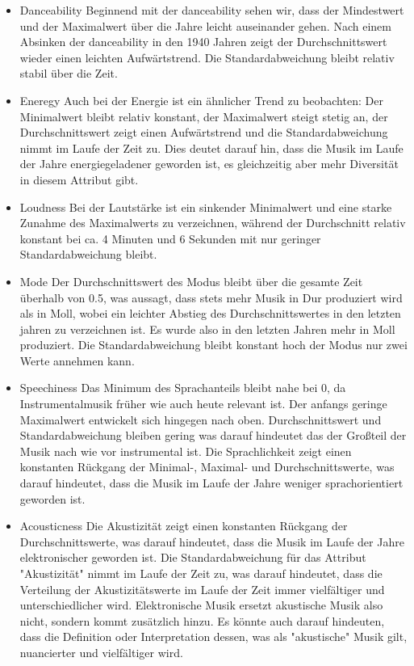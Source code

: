 \documentclass[conference]{IEEEtran}
\begin{document}
\begin{itemize}
\item{Danceability} Beginnend mit der danceability sehen wir, dass der Mindestwert und der Maximalwert über die Jahre leicht auseinander gehen. Nach einem Absinken der danceability in den 1940 Jahren zeigt der Durchschnittswert wieder einen leichten Aufwärtstrend. Die Standardabweichung bleibt relativ stabil über die Zeit.

\item{Eneregy} Auch bei der Energie ist ein ähnlicher Trend zu beobachten: Der Minimalwert bleibt relativ konstant, der Maximalwert steigt stetig an, der Durchschnittswert zeigt einen Aufwärtstrend und die Standardabweichung nimmt im Laufe der Zeit zu. Dies deutet darauf hin, dass die Musik im Laufe der Jahre energiegeladener geworden ist, es gleichzeitig aber mehr Diversität in diesem Attribut gibt.

\item{Loudness} Bei der Lautstärke ist ein sinkender Minimalwert und eine starke Zunahme des Maximalwerts zu verzeichnen, während der Durchschnitt relativ konstant bei ca. 4 Minuten und 6 Sekunden mit nur geringer Standardabweichung bleibt.

\item{Mode} Der Durchschnittswert des Modus bleibt über die gesamte Zeit überhalb von 0.5, was aussagt, dass stets mehr Musik in Dur produziert wird als in Moll, wobei ein leichter Abstieg des Durchschnittswertes in den letzten jahren zu verzeichnen ist. Es wurde also in den letzten Jahren mehr in Moll produziert. Die Standardabweichung bleibt konstant hoch der Modus nur zwei Werte annehmen kann.

\item{Speechiness} Das Minimum des Sprachanteils bleibt nahe bei 0, da Instrumentalmusik früher wie auch heute relevant ist. Der anfangs geringe Maximalwert entwickelt sich hingegen nach oben. Durchschnittswert und Standardabweichung bleiben gering was darauf hindeutet das der Großteil der Musik nach wie vor instrumental ist. Die Sprachlichkeit zeigt einen konstanten Rückgang der Minimal-, Maximal- und Durchschnittswerte, was darauf hindeutet, dass die Musik im Laufe der Jahre weniger sprachorientiert geworden ist. 

\item{Acousticness} Die Akustizität zeigt einen konstanten Rückgang der Durchschnittswerte, was darauf hindeutet, dass die Musik im Laufe der Jahre elektronischer geworden ist. Die Standardabweichung für das Attribut "Akustizität" nimmt im Laufe der Zeit zu, was darauf hindeutet, dass die Verteilung der Akustizitätswerte im Laufe der Zeit immer vielfältiger und unterschiedlicher wird. Elektronische Musik ersetzt akustische Musik also nicht, sondern kommt zusätzlich hinzu. Es könnte auch darauf hindeuten, dass die Definition oder Interpretation dessen, was als "akustische" Musik gilt, nuancierter und vielfältiger wird.


\end{itemize}
\end{document}
